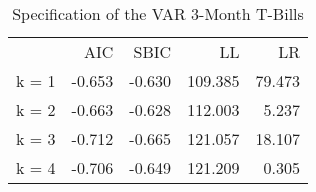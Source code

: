 \begin{table}[!h]
\caption{Specification of the VAR 3-Month T-Bills}
\centering
\begin{tabular}{lllll}
\cline{1-5}
\multicolumn{1}{c}{} &
  \multicolumn{1}{|r}{AIC} &
  \multicolumn{1}{r}{SBIC} &
  \multicolumn{1}{r}{LL} &
  \multicolumn{1}{r}{LR} \\
\cline{1-5}
\multicolumn{1}{l}{k = 1} &
  \multicolumn{1}{|r}{-0.653} &
  \multicolumn{1}{r}{-0.630} &
  \multicolumn{1}{r}{109.385} &
  \multicolumn{1}{r}{79.473} \\
\multicolumn{1}{l}{k = 2} &
  \multicolumn{1}{|r}{-0.663} &
  \multicolumn{1}{r}{-0.628} &
  \multicolumn{1}{r}{112.003} &
  \multicolumn{1}{r}{5.237} \\
\multicolumn{1}{l}{k = 3} &
  \multicolumn{1}{|r}{-0.712} &
  \multicolumn{1}{r}{-0.665} &
  \multicolumn{1}{r}{121.057} &
  \multicolumn{1}{r}{18.107} \\
\multicolumn{1}{l}{k = 4} &
  \multicolumn{1}{|r}{-0.706} &
  \multicolumn{1}{r}{-0.649} &
  \multicolumn{1}{r}{121.209} &
  \multicolumn{1}{r}{0.305} \\
\cline{1-5}
\end{tabular}
\end{table}
